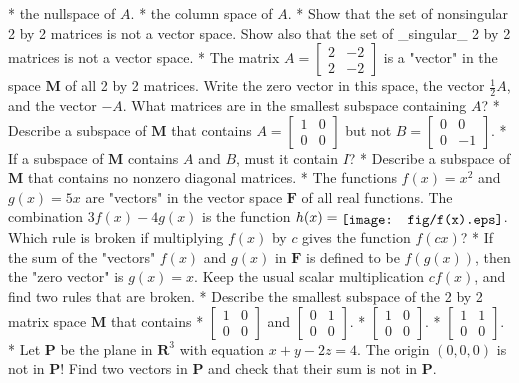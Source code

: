 * the nullspace of \(A\).
* the column space of \(A\).
* Show that the set of nonsingular 2 by 2 matrices is not a vector space. Show also that the set of _singular_ 2 by 2 matrices is not a vector space.
* The matrix \(A=\left[\begin{smallmatrix}2&-2\\ 2&-2\end{smallmatrix}\right]\) is a "vector" in the space \(\mathbf{M}\) of all 2 by 2 matrices. Write the zero vector in this space, the vector \(\frac{1}{2}A\), and the vector \(-A\). What matrices are in the smallest subspace containing \(A\)?
* Describe a subspace of \(\mathbf{M}\) that contains \(A=\left[\begin{smallmatrix}1&0\\ 0&0\end{smallmatrix}\right]\) but not \(B=\left[\begin{smallmatrix}0&0\\ 0&-1\end{smallmatrix}\right]\).
* If a subspace of \(\mathbf{M}\) contains \(A\) and \(B\), must it contain \(I\)?
* Describe a subspace of \(\mathbf{M}\) that contains no nonzero diagonal matrices.
* The functions \(f(x)=x^{2}\) and \(g(x)=5x\) are "vectors" in the vector space \(\mathbf{F}\) of all real functions. The combination \(3f(x)-4g(x)\) is the function \(h(x)=\raisebox{-1.5pt}{\texttt{[image: fig/f(x).eps]}}\). Which rule is broken if multiplying \(f(x)\) by \(c\) gives the function \(f(cx)\)?
* If the sum of the "vectors" \(f(x)\) and \(g(x)\) in \(\mathbf{F}\) is defined to be \(f(g(x))\), then the "zero vector" is \(g(x)=x\). Keep the usual scalar multiplication \(cf(x)\), and find two rules that are broken.
* Describe the smallest subspace of the 2 by 2 matrix space \(\mathbf{M}\) that contains
* \(\left[\begin{smallmatrix}1&0\\ 0&0\end{smallmatrix}\right]\) and \(\left[\begin{smallmatrix}0&1\\ 0&0\end{smallmatrix}\right]\).
* \(\left[\begin{smallmatrix}1&0\\ 0&0\end{smallmatrix}\right]\).
* \(\left[\begin{smallmatrix}1&1\\ 0&0\end{smallmatrix}\right]\).
* Let \(\mathbf{P}\) be the plane in \(\mathbf{R}^{3}\) with equation \(x+y-2z=4\). The origin \((0,0,0)\) is not in \(\mathbf{P}\)! Find two vectors in \(\mathbf{P}\) and check that their sum is not in \(\mathbf{P}\).
